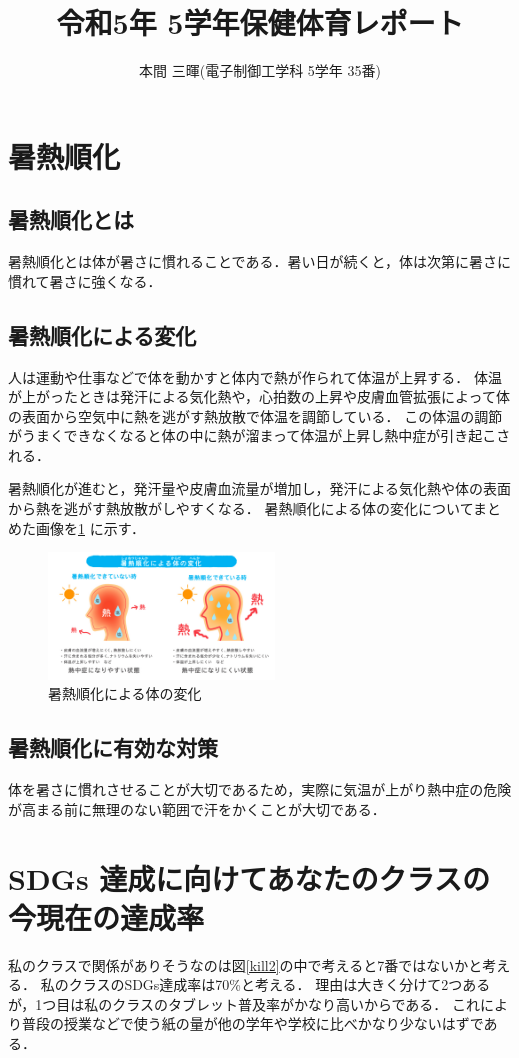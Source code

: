 \documentclass[twocolumn]{jsarticle}
\title{令和5年 5学年保健体育レポート}%
\author{本間 三暉(電子制御工学科 5学年 35番)}%
\date{}
\begin{document}
\twocolumn[%
  \centering
  \maketitle
]

\section{暑熱順化}
\subsection{暑熱順化とは}
暑熱順化とは体が暑さに慣れることである．暑い日が続くと，体は次第に暑さに慣れて暑さに強くなる．


\subsection{暑熱順化による変化}
人は運動や仕事などで体を動かすと体内で熱が作られて体温が上昇する．
体温が上がったときは発汗による気化熱や，心拍数の上昇や皮膚血管拡張によって体の表面から空気中に熱を逃がす熱放散で体温を調節している．
この体温の調節がうまくできなくなると体の中に熱が溜まって体温が上昇し熱中症が引き起こされる．

暑熱順化が進むと，発汗量や皮膚血流量が増加し，発汗による気化熱や体の表面から熱を逃がす熱放散がしやすくなる．
暑熱順化による体の変化についてまとめた画像を\ref{kill1} に示す．

\begin{figure}[H]
  \centering
  \includegraphics[width=6cm]{kill_1.jpg}
  \caption{暑熱順化による体の変化}
  \label{kill1}
\end{figure}

\subsection{暑熱順化に有効な対策}
体を暑さに慣れさせることが大切であるため，実際に気温が上がり熱中症の危険が高まる前に無理のない範囲で汗をかくことが大切である．

\section{SDGs 達成に向けてあなたのクラスの今現在の達成率}
私のクラスで関係がありそうなのは図\ref{kill2}の中で考えると7番ではないかと考える．
私のクラスのSDGs達成率は70\%と考える．
理由は大きく分けて2つあるが，1つ目は私のクラスのタブレット普及率がかなり高いからである．
これにより普段の授業などで使う紙の量が他の学年や学校に比べかなり少ないはずである．
\end{document}
